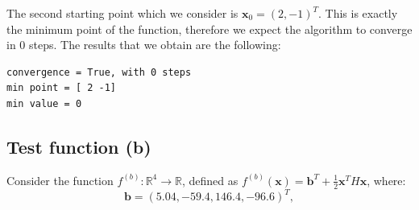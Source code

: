\documentclass[a4paper,11pt]{article}
\begin{document}
	\noindent The second starting point which we consider is $\textbf{x}_{0}=(2,-1)^{T}$. This is exactly the minimum point of the function, therefore we expect the algorithm to converge in $0$ steps. The results that we obtain are the following:
	
\begin{verbatim}
convergence = True, with 0 steps
min point = [ 2 -1]
min value = 0 
\end{verbatim}

	\subsection{Test function (b)}
	Consider the function $f^{(b)}:\mathbb{R}^{4} \rightarrow  \mathbb{R}$, defined as $f^{(b)}(\textbf{x}) = \textbf{b}^{T} + \frac{1}{2}\textbf{x}^{T}H\textbf{x}$, where:
	\begin{equation}
		\textbf{b} = (5.04, -59.4, 146.4, -96.6)^{T},
	\end{equation}
\end{document}

